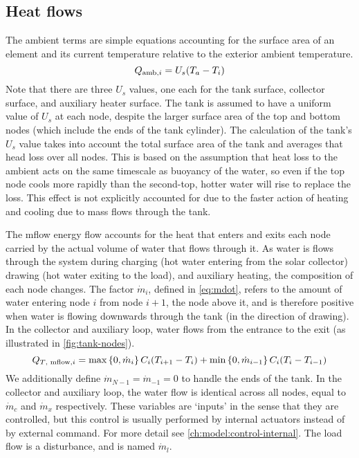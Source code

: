 \subsection{Heat flows}

The ambient terms are simple equations accounting for the surface area of an element and its current temperature relative to the exterior ambient temperature.
\begin{equation}
   \label{eq:Q-amb}
   Q_{\text{amb}, i} = U_s (T_a - T_i)
\end{equation}
Note that there are three $U_s$ values, one each for the tank surface, collector surface, and auxiliary heater surface.
The tank is assumed to have a uniform value of $U_s$ at each node, despite the larger surface area of the top and bottom nodes (which include the ends of the tank cylinder).
The calculation of the tank's $U_s$ value takes into account the total surface area of the tank and averages that head loss over all nodes.
This is based on the assumption that heat loss to the ambient acts on the same timescale as buoyancy of the water, so even if the top node cools more rapidly than the second-top, hotter water will rise to replace the loss.
This effect is not explicitly accounted for due to the faster action of heating and cooling due to mass flows through the tank.

The mflow energy flow accounts for the heat that enters and exits each node carried by the actual volume of water that flows through it.
As water is flows through the system during charging (hot water entering from the solar collector) drawing (hot water exiting to the load), and auxiliary heating, the composition of each node changes.
The factor $\dot{m}_i$, defined in \autoref{eq:mdot}, refers to the amount of water entering node $i$ from node $i+1$, the node above it, and is therefore positive when water is flowing downwards through the tank (in the direction of drawing).
In the collector and auxiliary loop, water flows from the entrance to the exit (as illustrated in \autoref{fig:tank-nodes}).
\begin{equation}
   \label{eq:tank-Q-mflow}
   Q_{\text{$T$, mflow}, i} = \max \left\{ 0, \dot{m}_i \right\}     C_i (T_{i+1} - T_i)
             + \min \left\{ 0, \dot{m}_{i-1} \right\} C_i (T_i - T_{i-1})
\end{equation}
We additionally define $\dot{m}_{N-1} = \dot{m}_{-1} = 0$ to handle the ends of the tank.
In the collector and auxiliary loop, the water flow is identical across all nodes, equal to $\dot{m}_c$ and $\dot{m}_x$ respectively.
These variables are `inputs' in the sense that they are controlled, but this control is usually performed by internal actuators instead of by external command.
For more detail see \autoref{ch:model:control-internal}.
The load flow is a disturbance, and is named $\dot{m}_l$.

